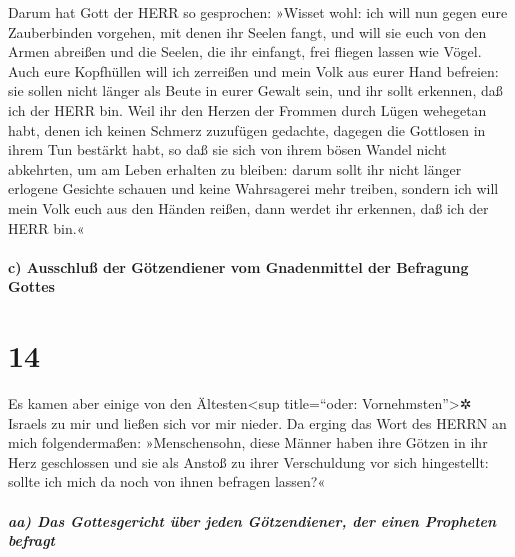 Darum hat Gott der HERR so gesprochen: »Wisset wohl: ich
will nun gegen eure Zauberbinden vorgehen, mit denen ihr Seelen fangt,
und will sie euch von den Armen abreißen und die Seelen, die ihr
einfangt, frei fliegen lassen wie Vögel. Auch eure
Kopfhüllen will ich zerreißen und mein Volk aus eurer Hand befreien: sie
sollen nicht länger als Beute in eurer Gewalt sein, und ihr sollt
erkennen, daß ich der HERR bin. Weil ihr den Herzen der
Frommen durch Lügen wehegetan habt, denen ich keinen Schmerz zuzufügen
gedachte, dagegen die Gottlosen in ihrem Tun bestärkt habt, so daß sie
sich von ihrem bösen Wandel nicht abkehrten, um am Leben erhalten zu
bleiben: darum sollt ihr nicht länger erlogene Gesichte
schauen und keine Wahrsagerei mehr treiben, sondern ich will mein Volk
euch aus den Händen reißen, dann werdet ihr erkennen, daß ich der HERR
bin.«

\hypertarget{c-ausschluuxdf-der-guxf6tzendiener-vom-gnadenmittel-der-befragung-gottes}{%
\paragraph{c) Ausschluß der Götzendiener vom Gnadenmittel der Befragung
Gottes}\label{c-ausschluuxdf-der-guxf6tzendiener-vom-gnadenmittel-der-befragung-gottes}}

\hypertarget{section-13}{%
\section{14}\label{section-13}}

Es kamen aber einige von den Ältesten\textless sup
title=``oder: Vornehmsten''\textgreater✲ Israels zu mir und ließen sich
vor mir nieder. Da erging das Wort des HERRN an mich
folgendermaßen: »Menschensohn, diese Männer haben ihre
Götzen in ihr Herz geschlossen und sie als Anstoß zu ihrer Verschuldung
vor sich hingestellt: sollte ich mich da noch von ihnen befragen
lassen?«

\hypertarget{aa-das-gottesgericht-uxfcber-jeden-guxf6tzendiener-der-einen-propheten-befragt}{%
\subparagraph{aa) Das Gottesgericht über jeden Götzendiener, der einen
Propheten
befragt}\label{aa-das-gottesgericht-uxfcber-jeden-guxf6tzendiener-der-einen-propheten-befragt}}

